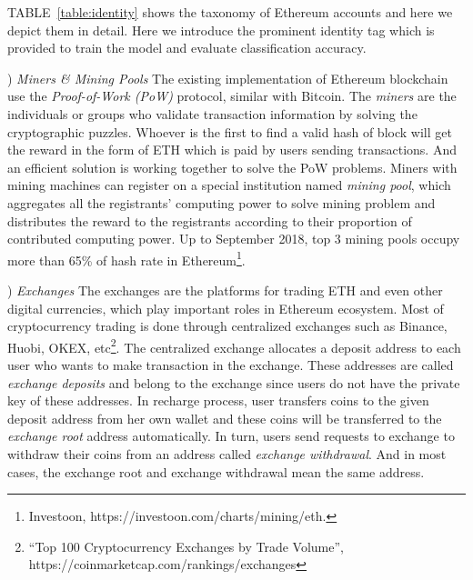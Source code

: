TABLE~\ref{table:identity} shows the taxonomy of Ethereum accounts and here we depict them in detail. Here we introduce the prominent identity tag which is provided to train the model and evaluate classification accuracy.

) \emph{Miners \& Mining Pools}
The existing implementation of Ethereum blockchain use the \emph{Proof-of-Work (PoW)} protocol, similar with Bitcoin. 
The \emph{miners} are the individuals or groups who validate transaction information by solving the cryptographic puzzles. Whoever is the first to find a valid hash of block will get the reward in the form of ETH which is paid by users sending transactions. And an efficient solution is working together to solve the PoW problems. Miners with mining machines can register on a special institution named \emph{mining pool}, which aggregates all the registrants' computing power to solve mining problem and distributes the reward to the registrants according to their proportion of contributed computing power. Up to September 2018, top $3$ mining pools occupy more than 65\% of hash rate in Ethereum\footnote{Investoon, https://investoon.com/charts/mining/eth.}.



) \emph{Exchanges}
The exchanges are the platforms for trading ETH and even other digital currencies, which play important roles in Ethereum ecosystem. Most of cryptocurrency trading is done through centralized exchanges such as Binance, Huobi, OKEX, etc\footnote{``Top 100 Cryptocurrency Exchanges by Trade Volume'', https://coinmarketcap.com/rankings/exchanges}. The centralized exchange allocates a deposit address to each user who wants to make transaction in the exchange. These addresses are called \emph{exchange deposits} and belong to the exchange since users do not have the private key of these addresses. In recharge process, user transfers coins to the given deposit address from her own wallet and these coins will be transferred to the \emph{exchange root} address automatically. In turn, users send requests to exchange to withdraw their coins from an address called \emph{exchange withdrawal}. And in most cases, the exchange root and exchange withdrawal mean the same address.

